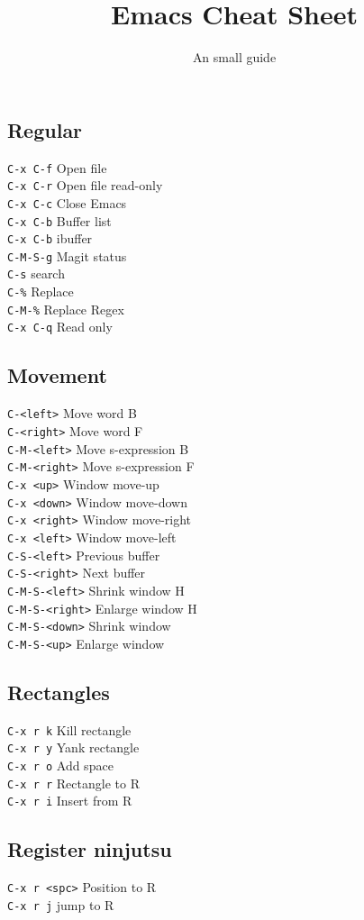 \message{ !name(CS.tex)}\documentclass{article}
\title{\vspace{-1.5cm} Emacs Cheat Sheet}
\author{An small guide}
\date{}
\begin{document}

\newcommand{\command}[2]{
  \texttt{#1} \hfill #2 \\
}

\begin{multicols*}{4}
\maketitle
\section*{Regular}

\command{C-x C-f}{Open file}
\command{C-x C-r}{Open file read-only}
\command{C-x C-c}{Close Emacs}
\command{C-x C-b}{Buffer list}
\command{C-x C-b}{ibuffer}
\command{C-M-S-g}{Magit status}
\command{C-s}{search}
\command{C-\%}{Replace}
\command{C-M-\%}{Replace Regex}
\command{C-x C-q}{Read only}

\subsection*{Movement}

\command{C-<left>}{Move word B}
\command{C-<right>}{Move word F}
\command{C-M-<left>}{Move s-expression B}
\command{C-M-<right>}{Move s-expression F}

\command{C-x <up>}{Window move-up}
\command{C-x <down>}{Window move-down}
\command{C-x <right>}{Window move-right}
\command{C-x <left>}{Window move-left}

\command{C-S-<left>}{Previous buffer}
\command{C-S-<right>}{Next buffer}
\command{C-M-S-<left>}{Shrink window H}
\command{C-M-S-<right>}{Enlarge window H}
\command{C-M-S-<down>}{Shrink window}
\command{C-M-S-<up>}{Enlarge window}

\subsection*{Rectangles}
\command{C-x r k}{Kill rectangle}
\command{C-x r y}{Yank rectangle}
\command{C-x r o}{Add space}
\command{C-x r r}{Rectangle to R}
\command{C-x r i}{Insert from R}

\subsection*{Register ninjutsu}

\command{C-x r <spc>}{Position to R}
\command{C-x r j}{jump to R}


\end{multicols*}
\end{document}
